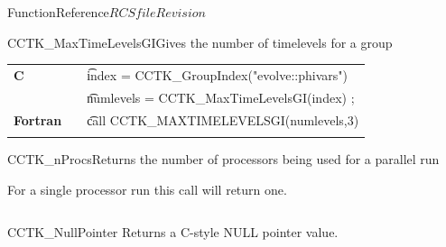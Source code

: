 \begin{cactuspart}{FunctionReference}{$RCSfile$}{$Revision$}
\begin{CCTKFunc}{CCTK\_MaxTimeLevelsGI}{Gives the number of timelevels for a group}
\label{CCTK-MaxTimeLevelsGI}
\showargs
\begin{params}
\end{params}
\begin{discussion}
\end{discussion}
\begin{examples}
\begin{tabular}{@{}p{3cm}cp{11cm}}
\hfill {\bf C} && {\t index = CCTK\_GroupIndex("evolve::phivars")}\\
               &&{\t numlevels = CCTK\_MaxTimeLevelsGI(index) ;}
\\
\hfill {\bf Fortran} && {\t call CCTK\_MAXTIMELEVELSGI(numlevels,3)}\\
\\
\end{tabular}
\end{examples}
\begin{errorcodes}
\end{errorcodes}
\end{CCTKFunc}






\begin{CCTKFunc}{CCTK\_nProcs}{Returns the number of processors being used for a parallel run}
\label{CCTK-nProcs}
\showargs
\begin{params}
\end{params}
\begin{discussion}
For a single processor run this call will return one.
\end{discussion}
\begin{examples}
\begin{tabular}{@{}p{3cm}cp{11cm}}
\end{tabular}
\end{examples}
\begin{errorcodes}
\end{errorcodes}
\end{CCTKFunc}


\begin{FunctionDescription}{CCTK\_NullPointer}%
\label{CCTK-NullPointer}
Returns a C-style NULL pointer value.


\end{FunctionDescription}
\end{cactuspart}
